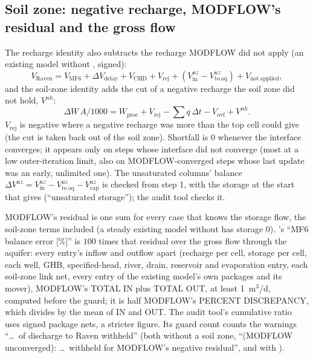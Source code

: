 \subsection{Soil zone: negative recharge, MODFLOW's residual and the gross flow}\label{sec:szbooks3}
The recharge identity also subtracts the recharge MODFLOW did not apply (an existing model without , signed):
\[\textstyle V_{\mathrm{Raven}}=V_{\mathrm{MF6}}+\Delta V_{\mathrm{delay}}+V_{\mathrm{CHD}}+V_{\mathrm{rej}}+(V^{uz}_{\mathrm{in}}-V^{uz}_{\mathrm{to\ aq}})+V_{\mathrm{not\ applied}},\]
and the soil-zone identity adds the cut of a negative recharge the soil zone did not hold, $V^{nh}$:
\[\textstyle \Delta W\,A/1000=W_{\mathrm{proc}}+V_{\mathrm{rej}}-\sum q\,\Delta t-V_{\mathrm{ovf}}+V^{nh}.\]
$V_{\mathrm{rej}}$ is negative where a negative recharge was more than the top cell could give (the cut is taken back out of
the soil zone). Shortfall is 0 whenever the interface converges; it appears only on steps whose interface did not converge
(most at a low outer-iteration limit, also on MODFLOW-converged steps whose last update was an early, unlimited one). The
unsaturated columns' balance $\Delta V^{uz}=V^{uz}_{\mathrm{in}}-V^{uz}_{\mathrm{to\ aq}}-V^{uz}_{\mathrm{cap}}$ is checked from
step 1, with the storage at the start that  gives (``unsaturated storage''); the audit tool checks it.

MODFLOW's residual is one sum for every case that knows the storage flow, the soil-zone terms included (a steady existing
model without  has storage 0). 's ``MF6 balance error [\%]'' is $100$ times that residual over the
gross flow through the aquifer: every entry's inflow and outflow apart (recharge per cell, storage per cell, each well, GHB,
specified-head, river, drain, reservoir and evaporation entry, each soil-zone link net, every entry of the existing model's
own packages and its mover), MODFLOW's TOTAL IN plus TOTAL OUT, at least 1~m$^3$/d, computed before the guard; it is half
MODFLOW's PERCENT DISCREPANCY, which divides by the mean of IN and OUT. The audit tool's cumulative ratio uses signed package
nets, a stricter figure. Its guard count counts the warnings ``\ldots\ of discharge to Raven withheld'' (both without a soil zone, ``(MODFLOW
unconverged): \ldots\ withheld for MODFLOW's negative residual'', and with ).
